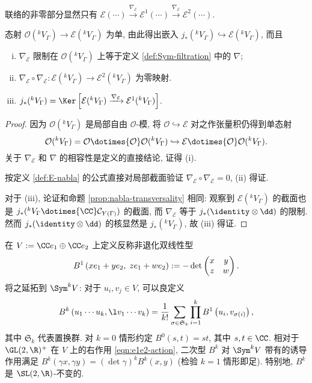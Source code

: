 联络的非零部分显然只有 $\mathcal{E}(\cdots) \xrightarrow{\nabla_{\mathcal{E}}} \mathcal{E}^1(\cdots) \xrightarrow{\nabla_{\mathcal{E}}} \mathcal{E}^2(\cdots)$.

\begin{lemma}\label{prop:E-nabla}
	态射 $\mathcal{O}({}^k V_\Gamma) \to \mathcal{E}({}^k V_\Gamma)$ 为单, 由此得出嵌入 $j_*({}^k V_\Gamma) \hookrightarrow \mathcal{E}({}^k V_\Gamma)$, 而且
	\begin{enumerate}[(i)]
		\item $\nabla_{\mathcal{E}}$ 限制在 $\mathcal{O}({}^k V_\Gamma)$ 上等于定义 \ref{def:Sym-filtration} 中的 $\nabla$;
		\item $\nabla_{\mathcal{E}} \circ \nabla_{\mathcal{E}}: \mathcal{E}({}^k V_\Gamma) \to \mathcal{E}^2({}^k V_\Gamma)$ 为零映射.
		\item $j_*({}^k V_\Gamma) = \Ker\left[ \mathcal{E}({}^k V_\Gamma) \xrightarrow{\nabla_{\mathcal{E}}} \mathcal{E}^1({}^k V_\Gamma) \right]$.
	\end{enumerate}
\end{lemma}
\begin{proof}
	因为 $\mathcal{O}({}^k V_\Gamma)$ 是局部自由 $\mathcal{O}$-模, 将 $\mathcal{O} \hookrightarrow \mathcal{E}$ 对之作张量积仍得到单态射
	\[ \mathcal{O}({}^k V_\Gamma) = \mathcal{O} \dotimes{\mathcal{O}} \mathcal{O}({}^k V_\Gamma) \hookrightarrow \mathcal{E} \dotimes{\mathcal{O}} \mathcal{O}({}^k V_\Gamma). \]
	关于 $\nabla_{\mathcal{E}}$ 和 $\nabla$ 的相容性是定义的直接结论, 证得 (i).

	按定义 \ref{def:E-nabla} 的公式直接对局部截面验证 $\nabla_{\mathcal{E}} \circ \nabla_{\mathcal{E}} = 0$, (ii) 得证.

	对于 (iii), 论证和命题 \ref{prop:nabla-transversality} 相同: 观察到 $\mathcal{E}({}^k V_\Gamma)$ 的截面也是 $j_* ({}^k V_\Gamma \dotimes{\CC} \mathcal{C}_{Y(\Gamma)})$ 的截面, 而 $\nabla_{\mathcal{E}}$ 等于 $j_*(\identity \otimes \dd)$ 的限制. 然而 $j_*(\identity \otimes \dd)$ 的核显然是 $j_* ({}^k V_\Gamma)$, 故 (iii) 得证.
\end{proof}

\begin{definition}
	在 $V := \CC e_1 \oplus \CC e_2$ 上定义反称非退化双线性型
	\[ B^1\left( xe_1 + ye_2, \; ze_1 + we_2 \right) := -\det\begin{pmatrix} x & y \\ z & w \end{pmatrix}. \]
	将之延拓到 $\Sym^k V$: 对于 $u_i, v_j \in V$, 可以良定义
	\[ B^k\left( u_1 \cdots u_k, \l v_1 \cdots v_k \right) = \frac{1}{k!} \sum_{\sigma \in \mathfrak{S}_k} \prod_{i=1}^k B^1\left( u_i, v_{\sigma(i)} \right), \]
	其中 $\mathfrak{S}_k$ 代表置换群. 对 $k=0$ 情形约定 $B^0(s, t) = st$, 其中 $s, t \in \CC$. 相对于 $\GL(2, \R)^+$ 在 $V$ 上的右作用 \eqref{eqn:e1e2-action}, 二次型 $B^k$ 对 $\Sym^k V$ 带有的诱导作用满足 $B^k(\gamma x, \gamma y) = (\det \gamma)^k B^k(x, y)$ (检验 $k = 1$ 情形即足). 特别地, $B^k$ 是 $\SL(2, \R)$-不变的.
\end{definition}

